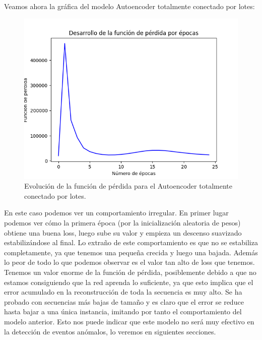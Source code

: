 Veamos ahora la gráfica del modelo Autoencoder totalmente conectado por lotes:
\begin{figure}[H]
	\centering
	\includegraphics[scale=0.75]{imagenes/loss_autoencoder_fully_connected_batch.png}
	\caption{Evolución de la función de pérdida para el Autoencoder totalmente conectado por lotes.}
	\label{img:loss-autoencoder-fully-connected-batch}
\end{figure}

En este caso podemos ver un comportamiento irregular. En primer lugar podemos ver cómo la primera época (por la inicialización aleatoria de pesos) obtiene una buena loss, luego sube su valor y empieza un descenso suavizado estabilizándose al final. Lo extraño de este comportamiento es que no se estabiliza completamente, ya que tenemos una pequeña crecida y luego una bajada. Además lo peor de todo lo que podemos observar es el valor tan alto de loss que tenemos. Tenemos un valor enorme de la función de pérdida, posiblemente debido a que no estamos consiguiendo que la red aprenda lo suficiente, ya que esto implica que el error acumulado en la reconstrucción de toda la secuencia es muy alto. Se ha probado con secuencias más bajas de tamaño y es claro que el error se reduce hasta bajar a una única instancia, imitando por tanto el comportamiento del modelo anterior. Esto nos puede indicar que este modelo no será muy efectivo en la detección de eventos anómalos, lo veremos en siguientes secciones.

